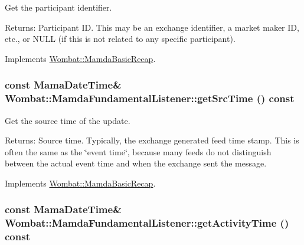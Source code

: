 Get the participant identifier. 

\begin{Desc}
\item[Returns:]Participant ID. This may be an exchange identifier, a market maker ID, etc., or NULL (if this is not related to any specific participant). \end{Desc}


Implements \hyperlink{classWombat_1_1MamdaBasicRecap_9aaa6f48d5e0bf04f98125378525241d}{Wombat::Mamda\-Basic\-Recap}.\hypertarget{classWombat_1_1MamdaFundamentalListener_f28f624d9a523c9d0db2717f2b3b69e9}{
\subsubsection[getSrcTime]{\setlength{\rightskip}{0pt plus 5cm}const Mama\-Date\-Time\& Wombat::Mamda\-Fundamental\-Listener::get\-Src\-Time () const}}
\label{classWombat_1_1MamdaFundamentalListener_f28f624d9a523c9d0db2717f2b3b69e9}


Get the source time of the update. 

\begin{Desc}
\item[Returns:]Source time. Typically, the exchange generated feed time stamp. This is often the same as the \char`\"{}event time\char`\"{}, because many feeds do not distinguish between the actual event time and when the exchange sent the message. \end{Desc}


Implements \hyperlink{classWombat_1_1MamdaBasicRecap_ad502f098385594aa2c3395e1603a93f}{Wombat::Mamda\-Basic\-Recap}.\hypertarget{classWombat_1_1MamdaFundamentalListener_b8d6e8e722a1654997c23f23a1ca4455}{
\subsubsection[getActivityTime]{\setlength{\rightskip}{0pt plus 5cm}const Mama\-Date\-Time\& Wombat::Mamda\-Fundamental\-Listener::get\-Activity\-Time () const}}
\label{classWombat_1_1MamdaFundamentalListener_b8d6e8e722a1654997c23f23a1ca4455}


